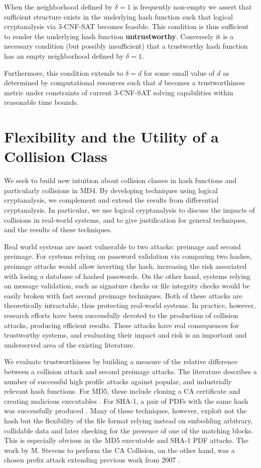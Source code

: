 \documentclass[conference]{IEEEtran}
\begin{document}
When the neighborhood defined by $\delta = 1$ is frequently non-empty
we assert that sufficient structure exists in the underlying hash
function such that logical cryptanalysis via 3-CNF-SAT becomes
feasible.  This condition is thus sufficient to render the underlying
hash function \textbf{untrustworthy}.  Conversely it is a necessary
condition (but possibly insufficient) that a trustworthy hash function
has an empty neighborhood defined by $\delta = 1$.

Furthermore, this condition extends to $\delta = d$ for some small
value of $d$ as determined by computational resources such that $d$
becomes a trustworthiness metric under constraints of current
3-CNF-SAT solving capabilities within reasonable time bounds.

\section{Flexibility and the Utility of a Collision Class} \label{Sec:Intuition}

We seek to build new intuition about collision classes in hash functions
and particularly collisions in MD4. By developing techniques using logical
cryptanalysis, we complement and extend the results from
differential cryptanalysis. In particular, we use logical cryptanalysis
to discuss the impacts of collisions in real-world systems, and to
give justification for general techniques, and the
results of these techniques.

Real world systems are most vulnerable to two attacks: preimage
and second preimage. For systems relying on password validation via
comparing two hashes, preimage attacks would allow inverting the hash,
increasing the risk associated with losing a database of hashed passwords.
On the other hand, systems relying on message validation, such as signature
checks or file integrity checks would be easily broken with fast second
preimage techniques. Both of these attacks are theoretically intractable, thus protecting
real-world systems. In practice, however, research efforts have been
successfully devoted to the production of collision attacks, producing
efficient results.  These attacks have real consequences for
trustworthy systems, and evaluating their impact and risk is an
important and underserved area of the existing literature.

We evaluate trustworthiness by building a measure of the relative difference between a collision
attack and second preimage attacks. The literature describes a number
of successful high profile attacks against popular, and industrially
relevant hash functions.
For MD5, these include cloning a CA certificate \cite{Stevens2009}
and creating malicious executables \cite{MD5Executables}. For SHA-1, a pair of
PDFs with the same hash was successfully produced \cite{cryptoeprint:2017:190}. Many of these
techniques, however, exploit not the hash but the flexibility of the file format
relying instead on embedding arbitrary, collidable data and later checking for
the presence of one of the matching blocks. This is especially obvious in the
MD5 executable and SHA-1 PDF attacks. The work by M. Stevens to perform the
CA Collision, on the other hand, was a chosen prefix attack extending
previous work from 2007 \cite{Stevens2007}.
\end{document}
